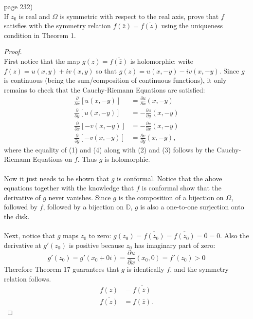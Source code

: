 \documentclass{article}
\newenvironment{problem}[2][Problem]{\begin{trivlist}
\item[\hskip \labelsep {\bfseries #1}\hskip \labelsep {\bfseries #2.}]}{\end{trivlist}}
\begin{document}
\begin{problem}{1} (page 232) \\
  If $z_0$ is real and $\Omega$ is symmetric with respect to the real axis,
  prove that $f$ satisfies with the symmetry relation
  $f(\bar{z}) = \overline{f(z)}$ using the uniqueness condition in Theorem 1.
\end{problem}
\begin{proof} \text{} \\
  First notice that the map $g(z) = \overline{f(\bar{z})}$ is holomorphic:
  write $f(z) = u(x, y) + iv(x, y)$ so that $g(z) = u(x, -y) - iv(x, -y)$. Since
  $g$ is continuous (being the sum/composition of continuous functions), it only
  remains to check that the Cauchy-Riemann Equations are satisfied:
  \begin{align}
    \frac{\partial}{\partial x}\left[u(x, -y)\right] &= \frac{\partial u}{\partial x}(x, -y) \\
    \frac{\partial}{\partial y}\left[u(x, -y)\right] &= -\frac{\partial u}{\partial y}(x, -y)\\
    \frac{\partial}{\partial x}\left[-v(x, -y)\right] &= -\frac{\partial v}{\partial x}(x, -y)\\
    \frac{\partial}{\partial y}\left[-v(x, -y)\right] &= \frac{\partial v}{\partial y}(x, -y),
  \end{align} where the equality of (1) and (4) along with (2) and (3) follows by
  the Cauchy-Riemann Equations on $f$. Thus $g$ is holomorphic.
  \\~\\
  Now it just needs to be shown that $g$ is conformal. Notice that the above
  equations together with the knowledge that $f$ is conformal show that the
  derivative of $g$ never vanishes. Since $g$ is the composition of a
  bijection on $\Omega$, followed by $f$, followed by a bijection on
  $\mathbb{D}$, $g$ is also a one-to-one surjection onto the disk.
  \\~\\
  Next, notice that $g$ maps $z_0$ to zero:
    $g(z_0) = \overline{f(\bar{z_0})} = \overline{f(z_0)} = \overline{0} = 0$.
  Also the derivative at $g'(z_0)$ is positive because $z_0$ has imaginary part
  of zero: \[
    g'(z_0) = g'(x_0 + 0i) = \frac{\partial u}{\partial x}(x_0, 0) = f'(z_0) > 0
  \]
  Therefore Theorem 17 guarantees that $g$ is identically $f$, and the symmetry
  relation follows. \begin{align*}
    f(z) &= \overline{f(\bar{z})}\\
    \overline{f(z)} &= f(\bar{z}).
  \end{align*}
\end{proof}
\pagebreak
\end{document}
